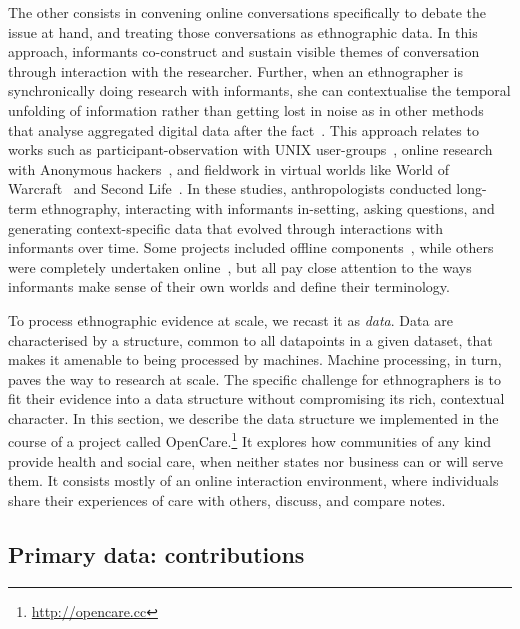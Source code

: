 \documentclass{llncs}
\begin{document}
The other consists in convening online conversations specifically to debate the issue at hand, and treating those conversations as ethnographic data. In this approach, informants co-construct and sustain visible themes of conversation through interaction with the researcher. Further, when an ethnographer is synchronically doing research with informants, she can contextualise the temporal unfolding of information rather than getting lost in noise as in other methods that analyse aggregated digital data after the fact~\cite{Coleman2010}. This approach relates to works such as participant-observation with UNIX user-groups~\cite{Kelty2008}, online research with Anonymous hackers~\cite{Coleman2015}, and fieldwork in virtual worlds like World of Warcraft~\cite{Nardi2010} and Second Life~\cite{Boellstorff2008}. In these studies, anthropologists conducted long-term ethnography, interacting with informants in-setting, asking questions, and generating context-specific data that evolved through interactions with informants over time. Some projects included offline components~\cite{Kelty2008}, while others were completely undertaken online~\cite{Boellstorff2008}, but all pay close attention to the ways informants make sense of their own worlds and define their terminology.


To process ethnographic evidence at scale, we recast it as \emph{data}. Data are characterised by a structure, common to all datapoints in a given dataset, that makes it amenable to being processed by machines. Machine processing, in turn, paves the way to research at scale. The specific challenge for ethnographers is to fit their evidence into a data structure without compromising its rich, contextual character.
In this section, we describe the data structure we implemented in the course of a project called OpenCare.\footnote{\url{http://opencare.cc}} It explores how communities of any kind provide health and social care, when neither states nor business can or will serve them. It consists mostly of an online interaction environment, where individuals share their experiences of care with others, discuss, and compare notes.

\subsection{Primary data: contributions} \label{ssec_primary_data}
\end{document}

